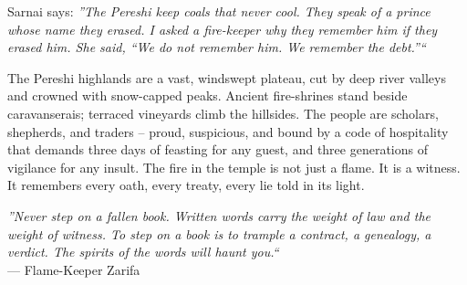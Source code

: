 \documentclass[12pt,oneside]{book}
\begin{document}
\noindent
Sarnai says: \textit{''The Pereshi keep coals that never cool. They speak of a prince whose name they erased. I asked a fire-keeper why they remember him if they erased him. She said, ``We do not remember him. We remember the debt.''``}

\noindent
The Pereshi highlands are a vast, windswept plateau, cut by deep river valleys and crowned with snow-capped peaks. Ancient fire-shrines stand beside caravanserais; terraced vineyards climb the hillsides. The people are scholars, shepherds, and traders -- proud, suspicious, and bound by a code of hospitality that demands three days of feasting for any guest, and three generations of vigilance for any insult. The fire in the temple is not just a flame. It is a witness. It remembers every oath, every treaty, every lie told in its light.

\vspace{0.5em}
\noindent\textit{''Never step on a fallen book. Written words carry the weight of law and the weight of witness. To step on a book is to trample a contract, a genealogy, a verdict. The spirits of the words will haunt you.``} \\
--- Flame-Keeper Zarifa
\end{document}
